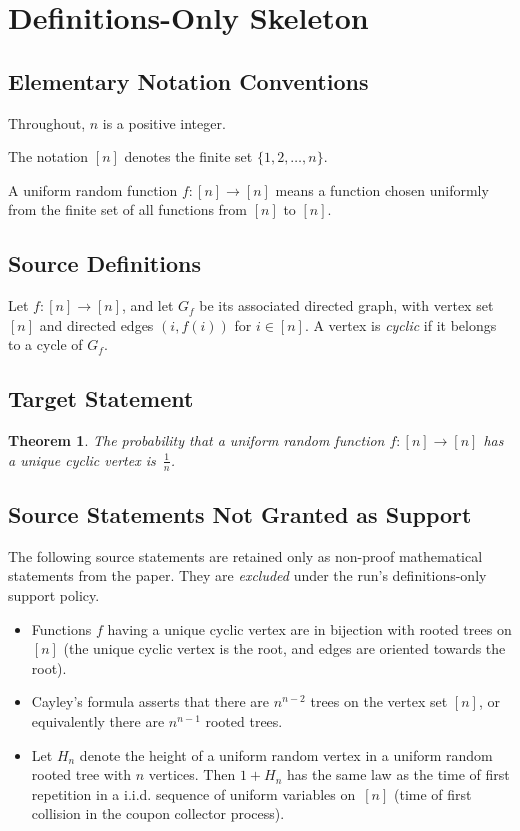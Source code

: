 \documentclass[a4paper]{article}
\theoremstyle{plain}
\newtheorem{theorem}{Theorem}
\numberwithin{theorem}{section}
\theoremstyle{definition}
\begin{document}
\section*{Definitions-Only Skeleton}

\subsection*{Elementary Notation Conventions}

Throughout, $n$ is a positive integer.

The notation $[n]$ denotes the finite set $\{1,2,\ldots,n\}$.

A uniform random function $f:[n]\to[n]$ means a function chosen uniformly from the finite set of all functions from $[n]$ to $[n]$.

\subsection*{Source Definitions}

Let $f:[n]\to[n]$, and let $G_f$ be its associated directed graph, with vertex set $[n]$ and directed edges $(i,f(i))$ for $i \in [n]$. A vertex is \emph{cyclic} if it belongs to a cycle of $G_f$.

\subsection*{Target Statement}

\begin{theorem}
	The probability that a uniform random function $f:[n]\to [n]$ has a unique cyclic vertex is~$\frac{1}{n}$.
\end{theorem}

\subsection*{Source Statements Not Granted as Support}

The following source statements are retained only as non-proof mathematical statements from the paper. They are \emph{excluded} under the run's definitions-only support policy.

\begin{itemize}
	\item Functions $f$ having a unique cyclic vertex are in bijection with rooted trees on $[n]$ (the unique cyclic vertex is the root, and edges are oriented towards the root).
	\item Cayley's formula asserts that there are $n^{n-2}$ trees on the vertex set $[n]$, or equivalently there are $n^{n-1}$ rooted trees.
	\item Let $H_n$ denote the height of a uniform random vertex in a uniform random rooted tree with $n$ vertices. Then $1+H_n$ has the same law as the time of first repetition in a i.i.d. sequence of uniform variables on~$[n]$ (time of first collision in the coupon collector process).
\end{itemize}
\end{document}

